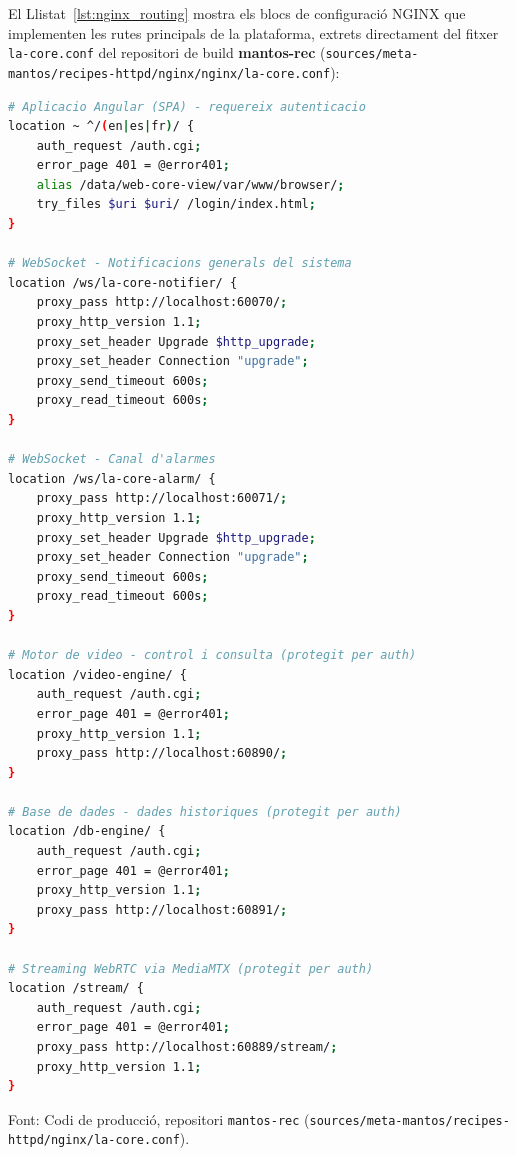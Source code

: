 El Llistat~\ref{lst:nginx_routing} mostra els blocs de configuració NGINX que implementen les rutes principals de la plataforma, extrets directament del fitxer \texttt{la-core.conf} del repositori de build \textbf{mantos-rec} (\texttt{sources/\allowbreak{}meta-mantos/\allowbreak{}recipes-httpd/\allowbreak{}nginx/\allowbreak{}nginx/\allowbreak{}la-core.conf}):

\begin{lstlisting}[language=bash, label={lst:nginx_routing}, caption={Fragment de la configuració NGINX (la-core.conf, repositori mantos-rec): rutes principals de la plataforma.}]
# Aplicacio Angular (SPA) - requereix autenticacio
location ~ ^/(en|es|fr)/ {
    auth_request /auth.cgi;
    error_page 401 = @error401;
    alias /data/web-core-view/var/www/browser/;
    try_files $uri $uri/ /login/index.html;
}

# WebSocket - Notificacions generals del sistema
location /ws/la-core-notifier/ {
    proxy_pass http://localhost:60070/;
    proxy_http_version 1.1;
    proxy_set_header Upgrade $http_upgrade;
    proxy_set_header Connection "upgrade";
    proxy_send_timeout 600s;
    proxy_read_timeout 600s;
}

# WebSocket - Canal d'alarmes
location /ws/la-core-alarm/ {
    proxy_pass http://localhost:60071/;
    proxy_http_version 1.1;
    proxy_set_header Upgrade $http_upgrade;
    proxy_set_header Connection "upgrade";
    proxy_send_timeout 600s;
    proxy_read_timeout 600s;
}

# Motor de video - control i consulta (protegit per auth)
location /video-engine/ {
    auth_request /auth.cgi;
    error_page 401 = @error401;
    proxy_http_version 1.1;
    proxy_pass http://localhost:60890/;
}

# Base de dades - dades historiques (protegit per auth)
location /db-engine/ {
    auth_request /auth.cgi;
    error_page 401 = @error401;
    proxy_http_version 1.1;
    proxy_pass http://localhost:60891/;
}

# Streaming WebRTC via MediaMTX (protegit per auth)
location /stream/ {
    auth_request /auth.cgi;
    error_page 401 = @error401;
    proxy_pass http://localhost:60889/stream/;
    proxy_http_version 1.1;
}
\end{lstlisting}
\smallskip\par{\small\noindent Font: Codi de producció, repositori \texttt{mantos-rec} (\texttt{sources/\allowbreak{}meta-mantos/\allowbreak{}recipes-httpd/\allowbreak{}nginx/\allowbreak{}la-core.conf}).}

